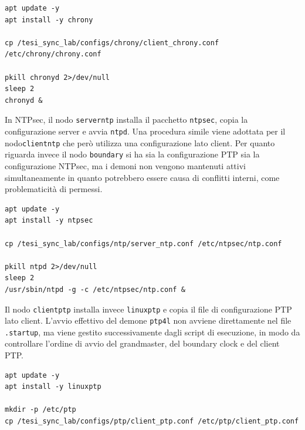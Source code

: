 \begin{listing}[H]
\begin{verbatim}
apt update -y
apt install -y chrony

cp /tesi_sync_lab/configs/chrony/client_chrony.conf /etc/chrony/chrony.conf

pkill chronyd 2>/dev/null
sleep 2
chronyd &
\end{verbatim}
\caption{Estratto di \texttt{clientchrony.startup}: configurazione e avvio del client Chrony.}
\label{lst:clientchrony_startup}
\end{listing}

In NTPsec, il nodo \texttt{serverntp} installa il pacchetto \texttt{ntpsec},
copia la configurazione server e avvia \texttt{ntpd}. Una procedura simile viene
adottata per il nodo\texttt{clientntp} che però utilizza una configurazione lato
client. Per quanto riguarda invece il nodo \texttt{boundary} si ha sia la
configurazione PTP sia la configurazione NTPsec, ma i demoni non vengono mantenuti
attivi simultaneamente in quanto potrebbero essere causa di conflitti interni,
come problematicità di permessi.

\begin{listing}[H]
\begin{verbatim}
apt update -y
apt install -y ntpsec

cp /tesi_sync_lab/configs/ntp/server_ntp.conf /etc/ntpsec/ntp.conf

pkill ntpd 2>/dev/null
sleep 2
/usr/sbin/ntpd -g -c /etc/ntpsec/ntp.conf &
\end{verbatim}
\caption{Estratto di \texttt{serverntp.startup}: configurazione e avvio di NTPsec.}
\label{lst:serverntp_startup}
\end{listing}

Il nodo \texttt{clientptp} installa invece \texttt{linuxptp} e copia il file di configurazione
PTP lato client. L'avvio effettivo del demone \texttt{ptp4l} non avviene direttamente
nel file \texttt{.startup}, ma viene gestito successivamente dagli script di esecuzione,
in modo da controllare l'ordine di avvio del grandmaster, del boundary clock e del
client PTP.

\begin{listing}[H]
\begin{verbatim}
apt update -y
apt install -y linuxptp

mkdir -p /etc/ptp
cp /tesi_sync_lab/configs/ptp/client_ptp.conf /etc/ptp/client_ptp.conf
\end{verbatim}
\caption{Estratto di \texttt{clientptp.startup}: predisposizione della configurazione PTP lato client.}
\label{lst:clientptp_startup}
\end{listing}

